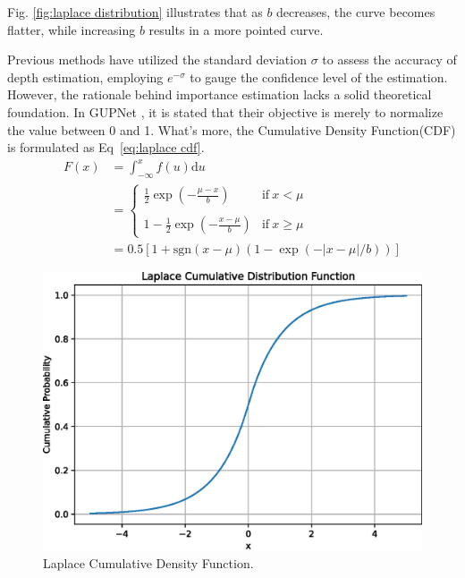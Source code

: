 \documentclass[journal]{IEEEtran}
\begin{document}
		Fig. \ref{fig:laplace distribution} illustrates that as $b$ decreases, the curve becomes flatter, while increasing $b$ results in a more pointed curve.
		
		Previous methods have utilized the standard deviation $\sigma$ to assess the accuracy of depth estimation, employing $e^{-\sigma}$ to gauge the confidence level of the estimation. However, the rationale behind importance estimation lacks a solid theoretical foundation. In GUPNet \cite{gupnet}, it is stated that their objective is merely to normalize the value between 0 and 1. What's more, the Cumulative Density Function(CDF) is formulated as Eq~\eqref{eq:laplace cdf}.
		\begin{equation}\begin{aligned}
		F(x)& =\int_{-\infty}^xf(u)\mathrm{d}u  \\
			&=\begin{cases}\frac12\exp\left(-\frac{\mu-x}b\right)&\mathrm{if~}x<\mu\\
				\\1-\frac12\exp\left(-\frac{x-\mu}b\right)&\mathrm{if~}x\geq\mu\end{cases} \\
			&=0.5\left[1+\mathrm{sgn}(x-\mu)\left(1-\exp(-|x-\mu|/b)\right)\right]
			\label{eq:laplace cdf}
		\end{aligned}\end{equation}
		\begin{figure}[!t]
		\centering
		\includegraphics[width=1.0\linewidth]{Figures/laplace/laplace_cdf}
		\caption{Laplace Cumulative Density Function.}
		\label{fig:laplace distribution cdf}
		\end{figure}
	
\end{document}
